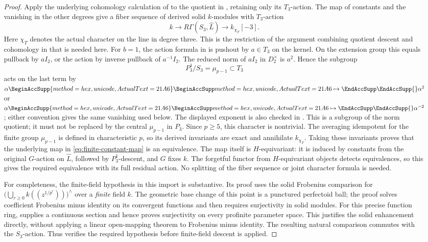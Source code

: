 \documentclass[11pt]{article}
\numberwithin{equation}{section}
\theoremstyle{definition}
\theoremstyle{remark}
\let\UnicodeOriginalMapsto\mapsto
\DeclareRobustCommand{\mapsto}{
  \BeginAccSupp{method=hex,unicode,ActualText=21A6}
  \UnicodeOriginalMapsto\EndAccSupp{}}
\begin{document}
\begin{proof}
Apply the underlying cohomology calculation of
\cite[Proposition~3.6.9]{BMR2026} to the quotient in ,
retaining only its $T_3$-action.  The map of constants and the vanishing
in the other degrees give a fiber sequence of derived solid $k$-modules
with $T_3$-action
\[
 k\longrightarrow R\Gamma(S_3,\widehat L)
   \longrightarrow k_{\chi_T}[-3].
\]
Here $\chi_T$ denotes the actual character on the line in degree three.
This is the restriction of the argument combining quotient descent and cohomology in
\cite[Theorem~3.6.10]{BMR2026} that is needed here.  For $b=1$, the action
formula in  is pushout by $a\in T_3$ on the kernel.
On the extension group this equals pullback by $aI_2$, or the
action by inverse pullback of $a^{-1}I_2$.  The reduced norm of $aI_2$
in $D_2^\times$ is $a^2$.  Hence the subgroup
\[
 P_3^1/S_3=\mu_{p-1}\subset T_3
\]
acts on the last term by $\alpha\mapsto\alpha^{2}$ or
$\alpha\mapsto\alpha^{-2}$; either convention gives the same vanishing
used below.  The displayed exponent is also checked in
\cite[Lemma 5.2.5]{BMR2026}.  This is a subgroup of the norm quotient;
it must not be replaced by the central $\mu_{p-1}$ in $P_3$.
Since $p\ge5$, this character is nontrivial.  The averaging idempotent
for the finite group $\mu_{p-1}$ is defined in characteristic $p$, so its
derived invariants are exact and annihilate $k_{\chi_T}$.
Taking these invariants proves that the underlying map in
\eqref{eq:finite-constant-map} is an equivalence.  The map itself is
$H$-equivariant: it is induced by constants from the original $G$-action
on $\widehat L$, followed by $P_3^1$-descent, and $G$ fixes $k$.
The forgetful functor from $H$-equivariant objects detects equivalences,
so this gives the required equivalence with its full residual action.
No splitting of the fiber sequence or joint character formula is needed.

For completeness, the finite-field hypothesis in this import is
substantive.  Its proof uses the solid Frobenius comparison
\cite[Lemma 3.6.3 and Corollary 3.6.8]{BMR2026} for
$\bigl(\bigcup_{r\ge0}k((z^{1/p^r}))\bigr)^{\wedge}$
over a \emph{finite} field $k$.
The geometric base change of this point is a punctured perfectoid ball;
the proof solves coefficient Frobenius minus identity on its convergent functions
and then requires surjectivity in solid modules.  For this precise
function ring,  supplies a continuous
section and hence proves surjectivity on every profinite parameter space.
This justifies the solid enhancement directly, without applying a
linear open-mapping theorem to Frobenius minus identity.  The resulting natural
comparison commutes with the $S_3$-action.  Thus
 verifies the required hypothesis before finite-field
descent is applied.


\end{proof}
\end{document}
